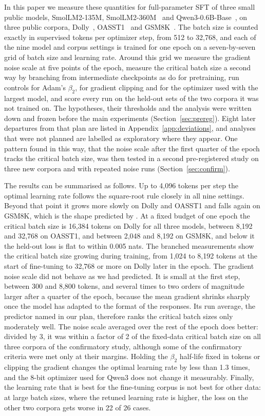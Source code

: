 \documentclass[10pt]{article}
\begin{document}
In this paper we measure these quantities for full-parameter SFT of three small public models, SmolLM2-135M, SmolLM2-360M~\citep{allal2025smollm2} and Qwen3-0.6B-Base~\citep{qwen3}, on three public corpora, Dolly~\citep{dolly2023}, OASST1~\citep{kopf2023oasst} and GSM8K~\citep{cobbe2021gsm8k}. The batch size is counted exactly in supervised tokens per optimizer step, from 512 to 32,768, and each of the nine model and corpus settings is trained for one epoch on a seven-by-seven grid of batch size and learning rate. Around this grid we measure the gradient noise scale at five points of the epoch, measure the critical batch size a second way by branching from intermediate checkpoints as \citet{merrill2025} do for pretraining, run controls for Adam's $\beta_2$, for gradient clipping and for the optimizer used with the largest model, and score every run on the held-out sets of the two corpora it was not trained on. The hypotheses, their thresholds and the analysis were written down and frozen before the main experiments (Section~\ref{sec:prereg}). Eight later departures from that plan are listed in Appendix~\ref{app:deviations}, and analyses that were not planned are labelled as exploratory where they appear. One pattern found in this way, that the noise scale after the first quarter of the epoch tracks the critical batch size, was then tested in a second pre-registered study on three new corpora and with repeated noise runs (Section~\ref{sec:confirm}).

The results can be summarised as follows. Up to 4,096 tokens per step the optimal learning rate follows the square-root rule closely in all nine settings. Beyond that point it grows more slowly on Dolly and OASST1 and falls again on GSM8K, which is the shape predicted by \citet{li2024surge}. At a fixed budget of one epoch the critical batch size is 16,384 tokens on Dolly for all three models, between 8,192 and 32,768 on OASST1, and between 2,048 and 8,192 on GSM8K, and below it the held-out loss is flat to within 0.005 nats. The branched measurements show the critical batch size growing during training, from 1,024 to 8,192 tokens at the start of fine-tuning to 32,768 or more on Dolly later in the epoch. The gradient noise scale did not behave as we had predicted. It is small at the first step, between 300 and 8,800 tokens, and several times to two orders of magnitude larger after a quarter of the epoch, because the mean gradient shrinks sharply once the model has adapted to the format of the responses. Its run average, the predictor named in our plan, therefore ranks the critical batch sizes only moderately well. The noise scale averaged over the rest of the epoch does better: divided by 3, it was within a factor of 2 of the fixed-data critical batch size on all three corpora of the confirmatory study, although some of the confirmatory criteria were met only at their margins. Holding the $\beta_2$ half-life fixed in tokens or clipping the gradient changes the optimal learning rate by less than 1.3 times, and the 8-bit optimizer used for Qwen3 does not change it measurably. Finally, the learning rate that is best for the fine-tuning corpus is not best for other data: at large batch sizes, where the retuned learning rate is higher, the loss on the other two corpora gets worse in 22 of 26 cases.
\end{document}
